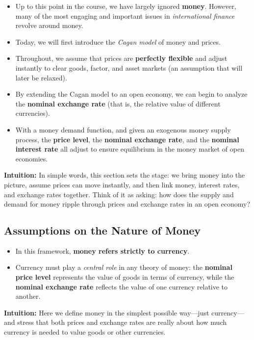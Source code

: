 \documentclass[12pt]{article}
\begin{document}
\begin{itemize}
    \item Up to this point in the course, we have largely ignored \textbf{money}. However, many of the most engaging and important issues in \textit{international finance} revolve around money.  
    \item Today, we will first introduce the \textit{Cagan model} of money and prices.  
    \item Throughout, we assume that prices are \textbf{perfectly flexible} and adjust instantly to clear goods, factor, and asset markets (an assumption that will later be relaxed).  
    \item By extending the Cagan model to an open economy, we can begin to analyze the \textbf{nominal exchange rate} (that is, the relative value of different currencies).  
    \item With a money demand function, and given an exogenous money supply process, the \textbf{price level}, the \textbf{nominal exchange rate}, and the \textbf{nominal interest rate} all adjust to ensure equilibrium in the money market of open economies.  
\end{itemize}

\textbf{Intuition:} In simple words, this section sets the stage: we bring money into the picture, assume prices can move instantly, and then link money, interest rates, and exchange rates together. Think of it as asking: how does the supply and demand for money ripple through prices and exchange rates in an open economy?

\subsection*{\noindent\textbf{Assumptions on the Nature of Money}}

\begin{itemize}
    \item In this framework, \textbf{money refers strictly to currency}.  
    \item Currency must play a \textit{central role} in any theory of money: the \textbf{nominal price level} represents the value of goods in terms of currency, while the \textbf{nominal exchange rate} reflects the value of one currency relative to another.  
\end{itemize}

\textbf{Intuition:} Here we define money in the simplest possible way—just currency—and stress that both prices and exchange rates are really about how much currency is needed to value goods or other currencies.
\end{document}
